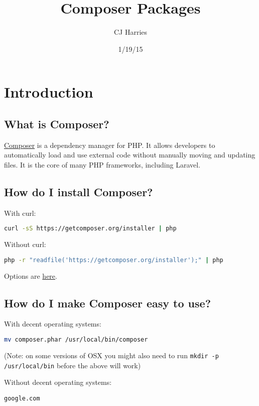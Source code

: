 \documentclass[pdf]{beamer}
\title{Composer Packages}
\author{CJ Harries}
\date{1/19/15}
\newcommand{\com}[1]{\lstinline$#1$}
\begin{document}
\begin{frame}
\titlepage
\end{frame}

\section{Introduction}
\subsection{What is Composer?}
\begin{frame}
\href{https://getcomposer.org/}{Composer} is a dependency manager for PHP. It allows developers to automatically load and use external code without manually moving and updating files. It is the core of many PHP frameworks, including Laravel.
\end{frame}

\subsection{How do I install Composer?}
\begin{frame}[fragile]
With curl:
\begin{lstlisting}[language=bash]
curl -sS https://getcomposer.org/installer | php
\end{lstlisting}
Without curl:
\begin{lstlisting}[language=bash]
php -r "readfile('https://getcomposer.org/installer');" | php
\end{lstlisting}
Options are \href{https://getcomposer.org/download/}{here}.
\end{frame}

\subsection{How do I make Composer easy to use?}
\begin{frame}[fragile]
With decent operating systems:
\begin{lstlisting}[language=bash]
mv composer.phar /usr/local/bin/composer
\end{lstlisting}
(Note: on some versions of OSX you might also need to run \com{mkdir -p /usr/local/bin} before the above will work)

Without decent operating systems:
\begin{lstlisting}
google.com
\end{lstlisting}
\end{frame}
\end{document}
